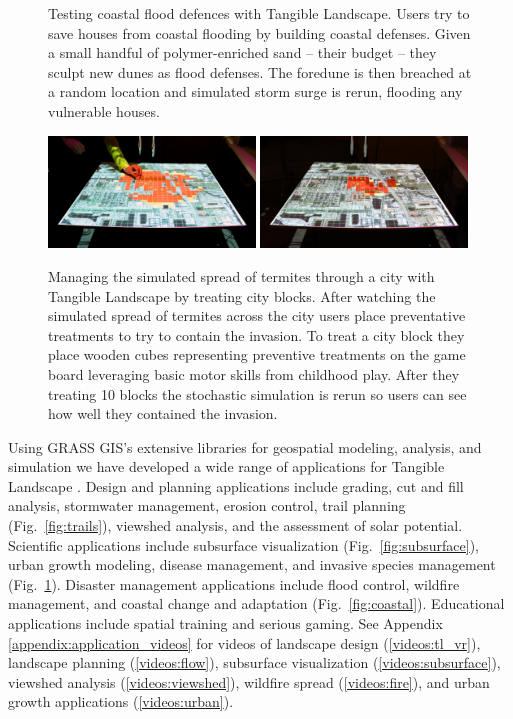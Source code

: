\documentclass[prodmode,acmtochi]{acmsmall} %
\begin{document}
\begin{figure}
\begin{center}
	\caption{Testing coastal flood defences with Tangible Landscape. Users try to save houses from coastal flooding by building coastal defenses. Given a small handful of polymer-enriched sand -- their budget -- they sculpt new dunes as flood defenses. The foredune is then breached at a random location and simulated storm surge is rerun, flooding any vulnerable houses.}
	\label{fig:coastal}
\end{center}
%
\begin{center}
		\includegraphics[width=0.49\textwidth]{images/applications/termite_game_2.jpg}
		\includegraphics[width=0.49\textwidth]{images/applications/termite_game_3.jpg}
	\caption{Managing the simulated spread of termites through a city with Tangible Landscape by treating city blocks. After watching the simulated spread of termites across the city users place preventative treatments to try to contain the invasion. To treat a city block they place wooden cubes representing preventive treatments on the game board leveraging basic motor skills from childhood play. After they treating 10 blocks the stochastic simulation is rerun so users can see how well they contained the invasion.}
	\label{fig:termites}
\end{center}
%
\end{figure}

Using GRASS GIS's extensive libraries for 
geospatial modeling, analysis, and simulation 
we have developed a wide range of applications for Tangible Landscape 
\cite{Petrasova2015}.
Design and planning applications include
grading, cut and fill analysis, stormwater management, erosion control, 
trail planning (Fig.~\ref{fig:trails}), viewshed analysis, and the assessment of solar potential. 
Scientific applications include
subsurface visualization (Fig.~\ref{fig:subsurface}), urban growth modeling, disease management, and invasive species management (Fig.~\ref{fig:termites}).
Disaster management applications include 
flood control, wildfire management, and coastal change and adaptation (Fig.~\ref{fig:coastal}). 
Educational applications include
spatial training and serious gaming.
%
See Appendix \ref{appendix:application_videos}
for videos of landscape design (\ref{videos:tl_vr}), 
landscape planning (\ref{videos:flow}), 
subsurface visualization (\ref{videos:subsurface}), 
viewshed analysis (\ref{videos:viewshed}), 
wildfire spread (\ref{videos:fire}), 
and urban growth applications (\ref{videos:urban}).
\end{document}
